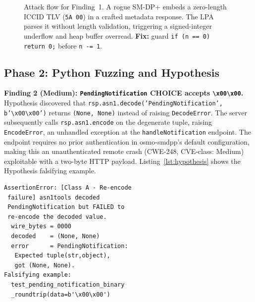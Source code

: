 \documentclass[final,3p,times,twocolumn]{elsarticle}
\begin{document}
\begin{figure}[h]
\caption{Attack flow for Finding~1. A rogue SM-DP+ embeds a zero-length ICCID
TLV (\texttt{5A~00}) in a crafted metadata response.
The LPA parses it without length validation, triggering a signed-integer
underflow and heap buffer overread.
\textbf{Fix:} guard \texttt{if (n == 0) return 0;} before \texttt{n -= 1}.}
\label{fig:attack1}
\end{figure}

\subsection{Phase 2: Python Fuzzing and Hypothesis}

\textbf{Finding 2 (Medium): \texttt{PendingNotification} CHOICE accepts \texttt{\textbackslash{}x00\textbackslash{}x00}.}
Hypothesis discovered that \texttt{rsp.asn1.decode('PendingNotification',}
\texttt{b'\textbackslash{}x00\textbackslash{}x00')} returns \texttt{(None,~None)} instead of
raising \texttt{DecodeError}.
The server subsequently calls \texttt{rsp.asn1.encode} on the degenerate
tuple, raising \texttt{EncodeError}, an unhandled exception at the
\texttt{handleNotification} endpoint.
The endpoint requires no prior authentication in osmo-smdpp's default
configuration, making this an unauthenticated remote crash (CWE-248,
CVE-class: Medium) exploitable with a two-byte HTTP payload.
Listing~\ref{lst:hypothesis} shows the Hypothesis falsifying example.

\begin{lstlisting}[style=pyoutstyle,caption={Hypothesis falsifying example for Finding~2. The two-byte input \texttt{0x00 0x00} is sufficient to crash the SM-DP+ \texttt{handleNotification} handler.},label=lst:hypothesis]
AssertionError: [Class A - Re-encode
 failure] asn1tools decoded
 PendingNotification but FAILED to
 re-encode the decoded value.
  wire_bytes = 0000
  decoded    = (None, None)
  error      = PendingNotification:
   Expected tuple(str,object),
   got (None, None).
Falsifying example:
  test_pending_notification_binary
  _roundtrip(data=b'\x00\x00')
\end{lstlisting}
\end{document}
